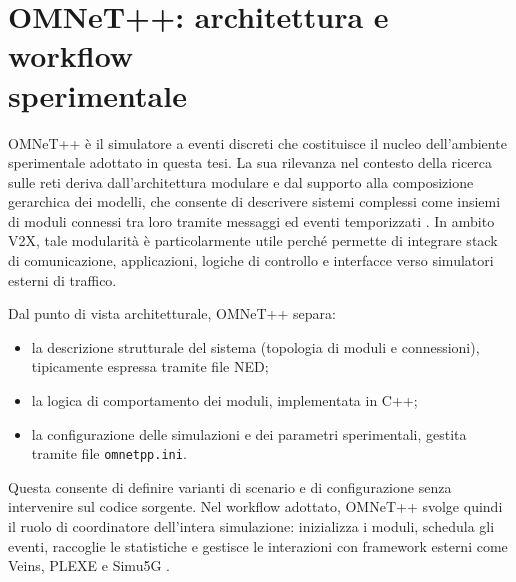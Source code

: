 \section[OMNeT++: architettura e workflow sperimentale]{OMNeT++: architettura e workflow\\ sperimentale}
\label{env:omnet}

OMNeT++ è il simulatore a eventi discreti che costituisce il nucleo dell’ambiente sperimentale adottato in questa tesi. La sua rilevanza nel contesto della ricerca sulle reti deriva dall’architettura modulare e dal supporto alla composizione gerarchica dei modelli, che consente di descrivere sistemi complessi come insiemi di moduli connessi tra loro tramite messaggi ed eventi temporizzati \cite{varga2008overview}. In ambito V2X, tale modularità è particolarmente utile perché permette di integrare stack di comunicazione, applicazioni, logiche di controllo e interfacce verso simulatori esterni di traffico.

Dal punto di vista architetturale, OMNeT++ separa:
\begin{itemize}
\item la descrizione strutturale del sistema (topologia di moduli e connessioni), tipicamente espressa tramite file NED;
\item la logica di comportamento dei moduli, implementata in C++;
\item la configurazione delle simulazioni e dei parametri sperimentali, gestita tramite file \texttt{omnetpp.ini}.
\end{itemize}

Questa consente di definire varianti di scenario e di configurazione senza intervenire sul codice sorgente. Nel workflow adottato, OMNeT++ svolge quindi il ruolo di coordinatore dell’intera simulazione: inizializza i moduli, schedula gli eventi, raccoglie le statistiche e gestisce le interazioni con framework esterni come Veins, PLEXE e Simu5G \cite{segata2023multi-technology, nardini2020simu5g}.
